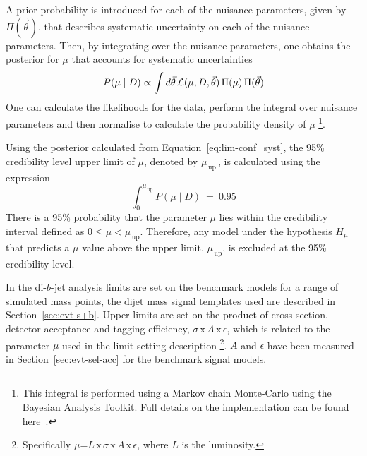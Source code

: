 A prior probability is introduced for each of the nuisance parameters, given by $\Pi(\vec{\theta})$,
that describes systematic uncertainty on each of the nuisance parameters.
Then, by integrating over the nuisance parameters,
one obtains the posterior for $\mu$ that accounts for systematic uncertainties
\begin{equation}
  P(\mu \mid D) \propto \int d \vec{\theta} \, \mathcal{L} (\mu, D, \vec{\theta} ) \, \Pi( \mu )  \, \Pi(\vec{\theta})
  \label{eq:lim-conf_syst}
\end{equation}
One can calculate the likelihoods for the data,
perform the integral over nuisance parameters
and then normalise to calculate the probability density of $\mu$
\footnote{This integral is performed using a Markov chain Monte-Carlo using the Bayesian Analysis Toolkit.
 Full details on the implementation can be found here~\cite{det-thesis_kate}.}.

Using the posterior calculated from Equation~\ref{eq:lim-conf_syst},
the 95\% credibility level upper limit of $\mu$, denoted by $\mu_{\,\text{up}}\,$,
is calculated using the expression
\begin{equation}
\int_0^{\mu_{\,\text{up}}} P(\mu \mid D)~=~0.95
\end{equation}
There is a 95\% probability that the parameter $\mu$ lies
within the credibility interval defined as \mbox{$0 \leq \mu < \mu_{\,\text{up}}$}.
Therefore, any model under the hypothesis $H_{\mu}$ that predicts a $\mu$
value above the upper limit, $\mu_{\,\text{up}}$, is excluded at the 95\% credibility level.

In the di-$b$-jet analysis limits are set on the benchmark models for a range of simulated mass points,
the dijet mass signal templates used are described in Section~\ref{sec:evt-s+b}.
Upper limits are set on the product of cross-section, detector acceptance and tagging efficiency,
$\sigma\,\text{x}\,\mathit{A}\,\text{x}\,\epsilon$,
which is related to the parameter $\mu$ used in the limit setting description
\footnote{
  Specifically $\mu$=$L\,\text{x}\,\sigma\,\text{x}\,\mathit{A}\,\text{x}\,\epsilon$, where $L$ is the luminosity.
}.
$\mathit{A}$ and $\epsilon$ have been measured in Section~\ref{sec:evt-sel-acc} for the benchmark signal models.




